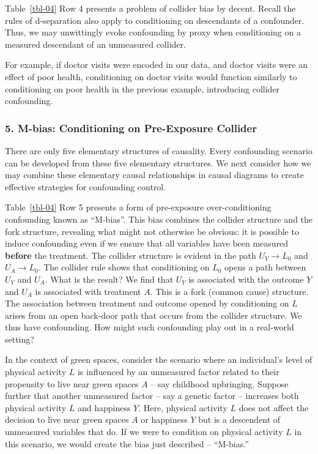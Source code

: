 \documentclass[
  singlecolumn]{article}
\begin{document}
Table~\ref{tbl-04} Row 4 presents a problem of collider bias by decent.
Recall the rules of d-separation also apply to conditioning on
descendants of a confounder. Thus, we may unwittingly evoke confounding
by proxy when conditioning on a measured descendant of an unmeasured
collider.

For example, if doctor visits were encoded in our data, and doctor
visits were an effect of poor health, conditioning on doctor visits
would function similarly to conditioning on poor health in the previous
example, introducing collider confounding.

\subsubsection{5. M-bias: Conditioning on Pre-Exposure
Collider}\label{section-mbias}

There are only five elementary structures of causality. Every
confounding scenario can be developed from these five elementary
structures. We next consider how we may combine these elementary causal
relationships in causal diagrams to create effective strategies for
confounding control.

Table~\ref{tbl-04} Row 5 presents a form of pre-exposure
over-conditioning confounding known as ``M-bias''. This bias combines
the collider structure and the fork structure, revealing what might not
otherwise be obvious: it is possible to induce confounding even if we
ensure that all variables have been measured \textbf{before} the
treatment. The collider structure is evident in the path \(U_Y \to L_0\)
and \(U_A \to L_0\). The collider rule shows that conditioning on
\(L_0\) opens a path between \(U_Y\) and \(U_A\). What is the result? We
find that \(U_Y\) is associated with the outcome \(Y\) and \(U_A\) is
associated with treatment \(A\). This is a fork (common cause)
structure. The association between treatment and outcome opened by
conditioning on \(L\) arises from an open back-door path that occurs
from the collider structure. We thus have confounding. How might such
confounding play out in a real-world setting?

In the context of green spaces, consider the scenario where an
individual's level of physical activity \(L\) is influenced by an
unmeasured factor related to their propensity to live near green spaces
\(A\) -- say childhood upbringing. Suppose further that another
unmeasured factor -- say a genetic factor -- increases both physical
activity \(L\) and happiness \(Y\). Here, physical activity \(L\) does
not affect the decision to live near green spaces \(A\) or happiness
\(Y\) but is a descendent of unmeasured variables that do. If we were to
condition on physical activity \(L\) in this scenario, we would create
the bias just described -- ``M-bias.''
\end{document}
